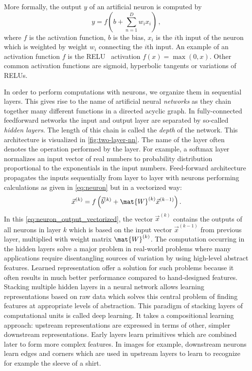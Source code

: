 \documentclass[\home/main.tex]{subfiles}
\begin{document}
More formally, the output $y$ of an artificial neuron is computed by
\begin{equation}\label{eq:neuron}
	y = f\left(b + \sum_{n = 1}^{D} w_i x_i \right)\,,
\end{equation}
where $f$ is the activation function, $b$ is the bias, $x_i$ is the $i$th input of the neuron which is weighted by weight $w_i$ connecting the $i$th input. An example of an activation function $f$ is the \gls{RELU}~\autocite{glorot2011deep} activation $f(x) = \max(0, x)$. Other common activation functions are sigmoid, hyperbolic tangents or variations of \glspl{RELU}.

In order to perform computations with neurons, we organize them in sequential layers. This gives rise to the name of artificial neural \textit{networks} as they chain together many different functions in a directed acyclic graph. In fully-connected feedforward networks the input and output layer are separated by so-called \textit{hidden layers}. The length of this chain is called the \emph{depth} of the network. This architecture is visualized in \cref{fig:two-layer-nn}. The name of the layer often denotes the operation performed by the layer. For example, a softmax layer normalizes an input vector of real numbers to probability distribution proportional to the exponentials in the input numbers. Feed-forward architecture propagates the inputs sequentially from layer to layer with neurons performing calculations as given in \cref{eq:neuron} but in a vectorized way:
\begin{equation} \label{eq:neuron_output_vectorized}
	\vec{x}^{(k)}=f\left(\vec{b}^{(k)} + \mat{W}^{(k)} \vec{x}^{(k-1)}\right).
\end{equation}
In this \cref{eq:neuron_output_vectorized}, the vector $\vec{x}^{(k)}$ contains the outputs of all neurons in layer $k$ which is based on the input vector $\vec{x}^{(k-1)}$ from previous layer, multiplied with weight matrix $\mat{W}^{(k)}$. The computation occurring in the hidden layers solve a major problem in real-world problems where many applications require disentangling sources of variation by using high-level abstract features. Learned representation offer a solution for such problems because it often results in much better performance compared to hand-designed features. Stacking multiple hidden layers in a neural network allows learning representations based on raw data which solves this central problem of finding features at appropriate levels of abstraction. This paradigm of stacking layers of computational units is called deep learning. It takes a compositional learning approach: upstream representations are expressed in terms of other, simpler downstream representations. Early layers learn primitives which are combined later to form more complex features. In images for example, downstream neurons learn edges and corners which are used in upstream layers to learn to recognize for example the sleeve of a shirt.
\end{document}
